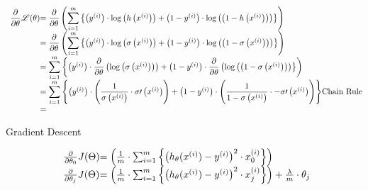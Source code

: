 \[
	\begin{array}{ l@{} l@{} r@{} } 
	{ \displaystyle \frac{\partial}{\partial \theta}}
	\mathscr{L}(\theta) 
	& = 
	{ \displaystyle \frac{\partial}{\partial \theta}}
	\left(
		{ \displaystyle \sum_{i=1}^{m} } \left\{ 
			\left(
				y^{(i)}
			\right) 
			\cdot 
			\log \left( 
			h \left(
				x^{(i)}
			\right) 
			\right) 
			+ 
			\left(
				1 - y^{(i)}
			\right) 
			\cdot 
			\log \left( 
			\left(
				1 -
				h \left(
					x^{(i)}
				\right) 
			\right) 
			\right) 
		\right\}
	\right) 
	\\ 
	& = 
	{ \displaystyle \frac{\partial}{\partial \theta}}
	\left(
		{ \displaystyle \sum_{i=1}^{m} } \left\{ 
			\left(
				y^{(i)}
			\right) 
			\cdot 
			\log \left( 
			\sigma \left(
				x^{(i)}
			\right) 
			\right) 
			+ 
			\left(
				1 - y^{(i)}
			\right) 
			\cdot 
			\log \left( 
			\left(
				1 -
				\sigma \left(
					x^{(i)}
				\right) 
			\right) 
			\right) 
		\right\}
	\right) 
	\\ 
	& = 
	{ \displaystyle \sum_{i=1}^{m} } \left\{ 
		\left(
			y^{(i)}
		\right) 
		\cdot 
		{ \displaystyle \frac{\partial}{\partial \theta}} \left( 
			\log \left( 
			\sigma \left(
				x^{(i)}
			\right) 
			\right) 
		\right) 
		+ 
		\left(
			1 - y^{(i)}
		\right) 
		\cdot 
		{ \displaystyle \frac{\partial}{\partial \theta}} \left( 
			\log \left( 
			\left(
				1 -
				\sigma \left(
					x^{(i)}
				\right) 
			\right) 
		\right) 
	\right\} 
	\right) 
	\\ 
	& = 
	{ \displaystyle \sum_{i=1}^{m} } \left\{ 
		\left(
			y^{(i)}
		\right) 
		\cdot 
		\left( 
			{ \displaystyle
			\frac
				{
					1
				}
				{
					\sigma \left( x^{(i)} \right)
				}
			} 
			\cdot 
			\sigma \prime \left( x^{(i)} \right) 
		\right) 
		+ 
		\left( 1 - y^{(i)} \right) 
		\cdot 
		\left( 
			{ \displaystyle
			\frac
				{
					1
				}
				{
					1 - \sigma \left( x^{(i)} \right)
				}
			} 
			\cdot 
			- \sigma \prime \left( x^{(i)} \right) 
		\right) 
	\right\} 
	& \text{Chain Rule} 
	\\ 
	& = 
	\end{array}
\]

Gradient Descent

\[
	\begin{array}{ l@{} l@{} } 
		\frac{\partial}{\partial \theta_0} J(\Theta)
		& =
		\left(
			\frac{1}{m}
			\cdot
			\sum_{i=1}^m \left\{
					\left(
						h_\theta(x^{(i)}) - y^{(i)}
					\right)^{2}
					\cdot
					x_{0}^{(i)}
			\right\}
		\right) 
		\\ 
		\frac{\partial}{\partial \theta_j} J(\Theta)
		& =
		\left(
			\frac{1}{m} \cdot
			\sum_{i=1}^m \left\{
				\left(
					h_\theta(x^{(i)}) - y^{(i)}
				\right)^{2}
				\cdot
				x_{j}^{(i)}
			\right\}
		\right) 
		+ 
		\frac{\lambda}{m}\cdot \theta_j 
		\\ 
	\end{array}
\]

